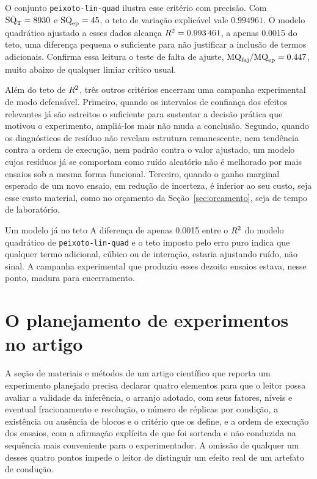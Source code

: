 \documentclass{doeapostila}
\begin{document}
O conjunto \texttt{peixoto-lin-quad} ilustra esse critério com precisão. Com
$\mathrm{SQ}_{\mathrm{T}} = 8930$ e $\mathrm{SQ}_{\mathrm{ep}} = 45$, o teto de variação explicável vale
$\num{0.994961}$. O modelo quadrático ajustado a esses dados alcança
$R^{2} = \num{0.993461}$, a apenas \num{0.0015} do teto, uma diferença
pequena o suficiente para não justificar a inclusão de termos adicionais.
Confirma essa leitura o teste de falta de ajuste, $\mathrm{MQ}_{\mathrm{faj}}/\mathrm{MQ}_{\mathrm{ep}} =
\num{0.447}$, muito abaixo de qualquer limiar crítico usual.

Além do teto de $R^{2}$, três outros critérios encerram uma campanha
experimental de modo defensável. Primeiro, quando os intervalos de confiança
dos efeitos relevantes já são estreitos o suficiente para sustentar a
decisão prática que motivou o experimento, ampliá-los mais não muda a
conclusão. Segundo, quando os diagnósticos de resíduo não revelam estrutura
remanescente, nem tendência contra a ordem de execução, nem padrão contra o
valor ajustado, um modelo cujos resíduos já se comportam como ruído aleatório
não é melhorado por mais ensaios sob a mesma forma funcional. Terceiro,
quando o ganho marginal esperado de um novo ensaio, em redução de incerteza,
é inferior ao seu custo, seja esse custo material, como no orçamento da
Seção~\ref{sec:orcamento}, seja de tempo de laboratório.

\begin{aplicacao}{Um modelo já no teto}
  A diferença de apenas \num{0.0015} entre o $R^{2}$ do modelo quadrático de
  \texttt{peixoto-lin-quad} e o teto imposto pelo erro puro indica que
  qualquer termo adicional, cúbico ou de interação, estaria ajustando ruído,
  não sinal. A campanha experimental que produziu esses dezoito ensaios
  estava, nesse ponto, madura para encerramento.
\end{aplicacao}

\section{O planejamento de experimentos no artigo}
\label{sec:artigo}

A seção de materiais e métodos de um artigo científico que reporta um
experimento planejado precisa declarar quatro elementos para que o leitor
possa avaliar a validade da inferência, o arranjo adotado, com seus fatores,
níveis e eventual fracionamento e resolução, o número de réplicas por
condição, a existência ou ausência de blocos e o critério que os define, e a
ordem de execução dos ensaios, com a afirmação explícita de que foi sorteada
e não conduzida na sequência mais conveniente para o experimentador. A
omissão de qualquer um desses quatro pontos impede o leitor de distinguir um
efeito real de um artefato de condução.
\end{document}
